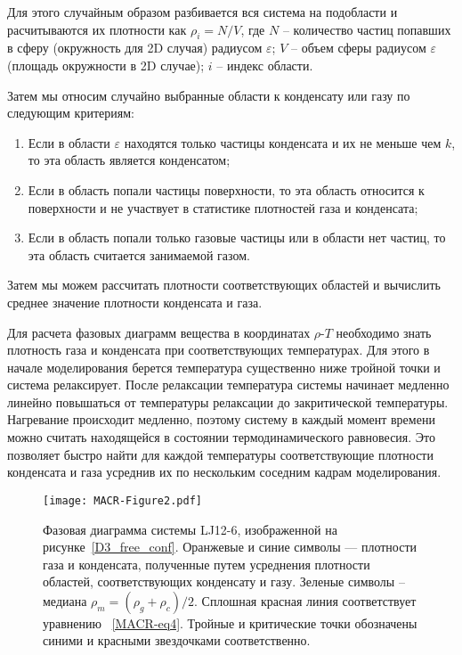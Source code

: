 Для этого случайным образом разбивается вся система на подобласти и расчитываются их плотности как $\rho_i = N / V$, где $N$ -- количество частиц попавших в сферу (окружность для 2D случая) радиусом $\varepsilon$; $V$ -- объем сферы радиусом $\varepsilon$ (площадь окружности в 2D случае); $i$ -- индекс области.

Затем мы относим случайно выбранные области к конденсату или газу по следующим критериям:
\begin{enumerate}
    \item Если в области $\varepsilon$ находятся только частицы конденсата и их не меньше чем $k$, то эта область является конденсатом;
    \item Если в область попали частицы поверхности, то эта область относится к поверхности и не участвует в статистике плотностей газа и конденсата;
    \item Если в область попали только газовые частицы или в области нет частиц, то эта область считается занимаемой газом.
\end{enumerate}
Затем мы можем рассчитать плотности соответствующих областей и вычислить среднее значение плотности конденсата и газа.

Для расчета фазовых диаграмм вещества в координатах $\rho$-$T$ необходимо знать плотность газа и конденсата при соответствующих температурах.
Для этого в начале моделирования берется температура существенно ниже тройной точки и система релаксирует.
После релаксации температура системы начинает медленно линейно повышаться от температуры релаксации до закритической температуры.
Нагревание происходит медленно, поэтому систему в каждый момент времени можно считать находящейся в состоянии термодинамического равновесия.
Это позволяет быстро найти для каждой температуры соответствующие плотности конденсата и газа усреднив их по нескольким соседним кадрам моделирования.

\begin{figure}[!t]
    \centering
    \texttt{[image: MACR-Figure2.pdf]}
    \caption{Фазовая диаграмма системы LJ12-6, изображенной на рисунке~\ref{D3_free_conf}.
    Оранжевые и синие символы — плотности газа и конденсата, полученные путем усреднения плотности областей, соответствующих конденсату и газу. Зеленые символы -- медиана $\rho_m=(\rho_g+\rho_c)/2$.
    Сплошная красная линия соответствует уравнению ~\eqref{MACR-eq4}.
    Тройные и критические точки обозначены синими и красными звездочками соответственно.}
    \label{phase_diagram}
\end{figure}




